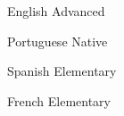 

\begin{cvskills}

  \cvskill
    {English} %
    {Advanced} %

  \cvskill
    {Portuguese} %
    {Native} %

  \cvskill
    {Spanish} %
    {Elementary} %
    
  \cvskill
    {French} %
    {Elementary} %

\end{cvskills}